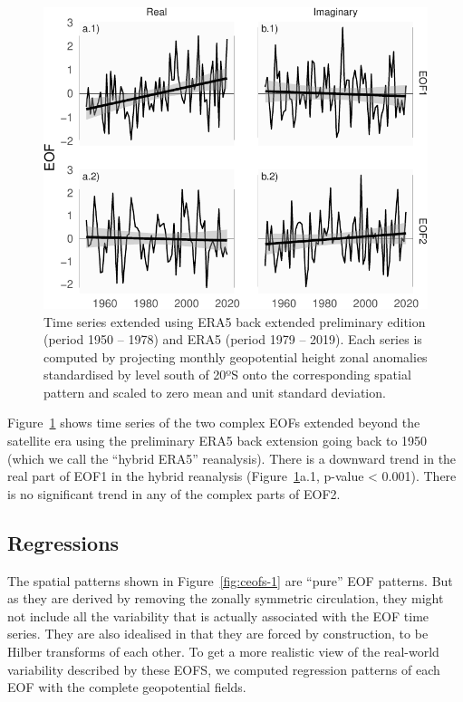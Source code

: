 \documentclass[smallextended]{svjour3}       %
\begin{document}
\begin{figure}
\centering
\includegraphics{../figures/extended-series-1.pdf}
\caption{\label{fig:extended-series}Time series extended using ERA5 back extended preliminary edition (period 1950 -- 1978) and ERA5 (period 1979 -- 2019). Each series is computed by projecting monthly geopotential height zonal anomalies standardised by level south of 20ºS onto the corresponding spatial pattern and scaled to zero mean and unit standard deviation.}
\end{figure}

Figure~\ref{fig:extended-series} shows time series of the two complex EOFs extended beyond the satellite era using the preliminary ERA5 back extension going back to 1950 (which we call the ``hybrid ERA5'' reanalysis). There is a downward trend in the real part of EOF1 in the hybrid reanalysis (Figure~\ref{fig:extended-series}a.1, p-value \textless{} 0.001). There is no significant trend in any of the complex parts of EOF2.

\hypertarget{regressions}{%
\subsection{Regressions}\label{regressions}}

The spatial patterns shown in Figure~\ref{fig:ceofs-1} are ``pure'' EOF patterns. But as they are derived by removing the zonally symmetric circulation, they might not include all the variability that is actually associated with the EOF time series. They are also idealised in that they are forced by construction, to be Hilber transforms of each other. To get a more realistic view of the real-world variability described by these EOFS, we computed regression patterns of each EOF with the complete geopotential fields.
\end{document}
